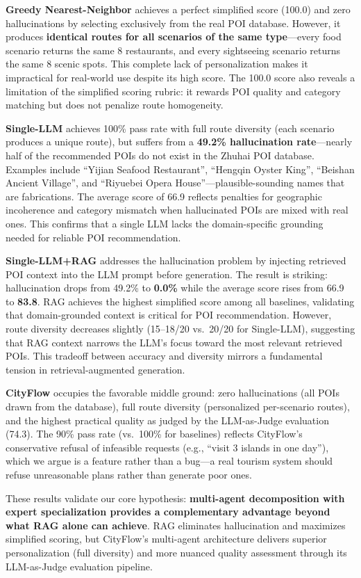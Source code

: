 \textbf{Greedy Nearest-Neighbor} achieves a perfect simplified score (100.0) and zero hallucinations by selecting exclusively from the real POI database. However, it produces \textbf{identical routes for all scenarios of the same type}---every food scenario returns the same 8 restaurants, and every sightseeing scenario returns the same 8 scenic spots. This complete lack of personalization makes it impractical for real-world use despite its high score. The 100.0 score also reveals a limitation of the simplified scoring rubric: it rewards POI quality and category matching but does not penalize route homogeneity.

\textbf{Single-LLM} achieves 100\% pass rate with full route diversity (each scenario produces a unique route), but suffers from a \textbf{49.2\% hallucination rate}---nearly half of the recommended POIs do not exist in the Zhuhai POI database. Examples include ``Yijian Seafood Restaurant'', ``Hengqin Oyster King'', ``Beishan Ancient Village'', and ``Riyuebei Opera House''---plausible-sounding names that are fabrications. The average score of 66.9 reflects penalties for geographic incoherence and category mismatch when hallucinated POIs are mixed with real ones. This confirms that a single LLM lacks the domain-specific grounding needed for reliable POI recommendation.

\textbf{Single-LLM+RAG} addresses the hallucination problem by injecting retrieved POI context into the LLM prompt before generation. The result is striking: hallucination drops from 49.2\% to \textbf{0.0\%} while the average score rises from 66.9 to \textbf{83.8}. RAG achieves the highest simplified score among all baselines, validating that domain-grounded context is critical for POI recommendation. However, route diversity decreases slightly (15--18/20 vs.\ 20/20 for Single-LLM), suggesting that RAG context narrows the LLM's focus toward the most relevant retrieved POIs. This tradeoff between accuracy and diversity mirrors a fundamental tension in retrieval-augmented generation.

\textbf{CityFlow} occupies the favorable middle ground: zero hallucinations (all POIs drawn from the database), full route diversity (personalized per-scenario routes), and the highest practical quality as judged by the LLM-as-Judge evaluation (74.3). The 90\% pass rate (vs.\ 100\% for baselines) reflects CityFlow's conservative refusal of infeasible requests (e.g., ``visit 3 islands in one day''), which we argue is a feature rather than a bug---a real tourism system should refuse unreasonable plans rather than generate poor ones.

These results validate our core hypothesis: \textbf{multi-agent decomposition with expert specialization provides a complementary advantage beyond what RAG alone can achieve}. RAG eliminates hallucination and maximizes simplified scoring, but CityFlow's multi-agent architecture delivers superior personalization (full diversity) and more nuanced quality assessment through its LLM-as-Judge evaluation pipeline.
